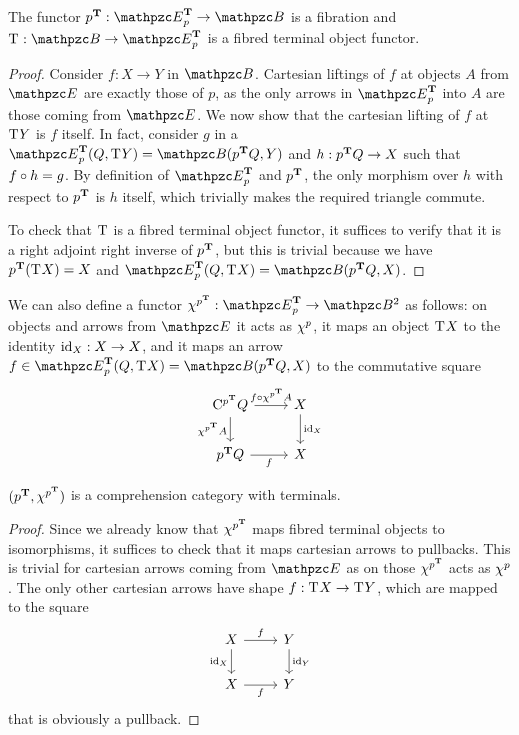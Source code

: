 \documentclass{lmcs} %
\theoremstyle{plain}\newtheorem{satz}[thm]{Satz} %
\begin{document}
\begin{prop}
The functor $\JTFib{p} : \JTDomE{p} \to \ct{B}$ is a fibration and $\term{} : \ct{B} \to \JTDomE{p}$ is a fibred terminal object functor. 
\end{prop}
\begin{proof}
Consider $f:X\to Y$ in $\ct{B}$. 
Cartesian liftings of $f$ at objects $A$ from $\ct{E}$ are exactly those of $p$, as the only arrows in $\JTDomE{p}$ into $A$ are those coming from $\ct{E}$. 
We now show that the cartesian lifting of $f$ at $\mathrm{T}^{} Y$ is $f$ itself. 
% 
In fact, consider $g$ in a $\Hom{\JTDomE{p}}(Q,\term{}Y) = \Hom{\ct{B}}(\JTFib{p}Q,Y)$ and $h:{p}^{\mathbf{T}}Q\to X$ such that $f\circ h = g$. 
By definition of $\JTDomE{p}$ and ${p}^{\mathbf{T}}$, the only morphism over $h$ with respect to ${p}^{\mathbf{T}}$ is $h$ itself, which trivially makes  the required triangle commute. 

To check that $\mathrm{T}^{}$ is a fibred terminal object functor, it suffices to verify that it is a right adjoint right inverse of ${p}^{\mathbf{T}}$, but this is trivial because we have ${p}^{\mathbf{T}}(\mathrm{T}^{} X) = X$ and $\Hom{\JTDomE{p}}(Q,\term{}X) = \Hom{\ct{B}}(\JTFib{p}Q,X)$. 
\end{proof} 

We can also define 
a functor $\jcomp{\JTFib{p}}:\JTDomE{p}\to\Arr{\ct{B}}$ as follows: 
on objects and arrows from $\ct{E}$ it acts as $\chi^{p}$, 
it maps an object $\mathrm{T}^{}X$ to the identity $\mathrm{id}_{X} : X \to X$, and 
it maps an arrow $f \in \Hom{\JTDomE{p}}(Q,\term{}X) = \Hom{\ct{B}}(\JTFib{p}Q,X)$ to the commutative square 
\[\begin{tikzcd}
  \comp{\JTFib{p}}Q 
  \ar[r, "f\arcmp\jcomp{\JTFib{p}}A"]
  \ar[d, "\jcomp{\JTFib{p}}A"']
& X 
  \ar[d, "\id{X}"]
\\
  \JTFib{p}Q 
  \ar[r, "f"'] 
& X 
\end{tikzcd}\]


\begin{prop}
$({p}^{\mathbf{T}},\chi^{{p}^{\mathbf{T}}})$ is a comprehension category with terminals. 
\end{prop}
\begin{proof}
Since we already know that $\chi^{{p}^{\mathbf{T}}}$ maps fibred terminal objects to isomorphisms, it suffices to check that it maps cartesian arrows to pullbacks. 
This is trivial for cartesian arrows coming from $\ct{E}$ as on those $\chi^{{p}^{\mathbf{T}}}$ acts as $\chi^{p}$. 
The only other cartesian arrows have shape $f : \mathrm{T}^{}X \to \mathrm{T}^{}Y$, which are mapped to the square 
\[\begin{tikzcd}
  X \ar[r, "f"]
    \ar[d, "\id{X}"']
& Y \ar[d,"\id{Y}"]
\\
  X \ar[r, "f"']
& Y
\end{tikzcd}\]
that is obviously a pullback. 
\end{proof}
\end{document}
